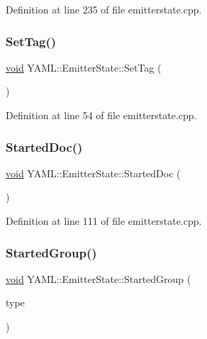 Definition at line 235 of file emitterstate.\+cpp.

\mbox{\label{class_y_a_m_l_1_1_emitter_state_aea17f20bb48bee16def826e27df033ab}} 
\subsubsection{\texorpdfstring{SetTag()}{SetTag()}}
{\footnotesize\ttfamily \mbox{\hyperlink{glad_8h_a950fc91edb4504f62f1c577bf4727c29}{void}} Y\+A\+M\+L\+::\+Emitter\+State\+::\+Set\+Tag (\begin{DoxyParamCaption}{ }\end{DoxyParamCaption})}



Definition at line 54 of file emitterstate.\+cpp.

\mbox{\label{class_y_a_m_l_1_1_emitter_state_a3857bc4592ab42c96399a6a02586efbb}} 
\subsubsection{\texorpdfstring{StartedDoc()}{StartedDoc()}}
{\footnotesize\ttfamily \mbox{\hyperlink{glad_8h_a950fc91edb4504f62f1c577bf4727c29}{void}} Y\+A\+M\+L\+::\+Emitter\+State\+::\+Started\+Doc (\begin{DoxyParamCaption}{ }\end{DoxyParamCaption})}



Definition at line 111 of file emitterstate.\+cpp.

\mbox{\label{class_y_a_m_l_1_1_emitter_state_a8856f8e15252abc2b1729eaccedf71cf}} 
\subsubsection{\texorpdfstring{StartedGroup()}{StartedGroup()}}
{\footnotesize\ttfamily \mbox{\hyperlink{glad_8h_a950fc91edb4504f62f1c577bf4727c29}{void}} Y\+A\+M\+L\+::\+Emitter\+State\+::\+Started\+Group (\begin{DoxyParamCaption}\item[{\mbox{\hyperlink{struct_y_a_m_l_1_1_group_type_aab9271cd8999a6694cb10670e6a5496f}{Group\+Type\+::value}}}]{type }\end{DoxyParamCaption})}



